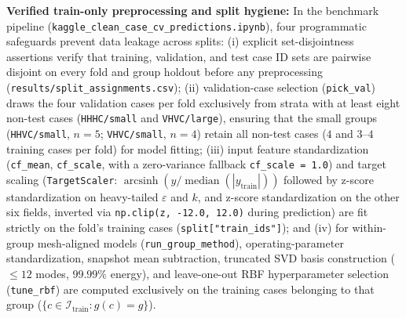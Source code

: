 \documentclass[11pt]{article}
\begin{document}
\noindent\textbf{Verified train-only preprocessing and split hygiene:} In the benchmark pipeline (\texttt{kaggle\_clean\_case\_cv\_predictions.ipynb}), four programmatic safeguards prevent data leakage across splits: (i) explicit set-disjointness assertions verify that training, validation, and test case ID sets are pairwise disjoint on every fold and group holdout before any preprocessing (\texttt{results/split\_assignments.csv}); (ii) validation-case selection (\texttt{pick\_val}) draws the four validation cases per fold exclusively from strata with at least eight non-test cases (\texttt{HHHC/small} and \texttt{VHVC/large}), ensuring that the small groups (\texttt{HHVC/small}, $n=5$; \texttt{VHVC/small}, $n=4$) retain all non-test cases ($4$ and $3\text{--}4$ training cases per fold) for model fitting; (iii) input feature standardization (\texttt{cf\_mean}, \texttt{cf\_scale}, with a zero-variance fallback \texttt{cf\_scale = 1.0}) and target scaling (\texttt{TargetScaler}: $\operatorname{arcsinh}(y/\operatorname{median}(|y_{\mathrm{train}}|))$ followed by z-score standardization on heavy-tailed $\varepsilon$ and $k$, and z-score standardization on the other six fields, inverted via \texttt{np.clip(z, -12.0, 12.0)} during prediction) are fit strictly on the fold's training cases (\texttt{split["train\_ids"]}); and (iv) for within-group mesh-aligned models (\texttt{run\_group\_method}), operating-parameter standardization, snapshot mean subtraction, truncated SVD basis construction ($\le 12$ modes, $99.99\%$ energy), and leave-one-out RBF hyperparameter selection (\texttt{tune\_rbf}) are computed exclusively on the training cases belonging to that group ($\{c \in \mathcal{I}_{\mathrm{train}} : g(c) = g\}$).
\end{document}
